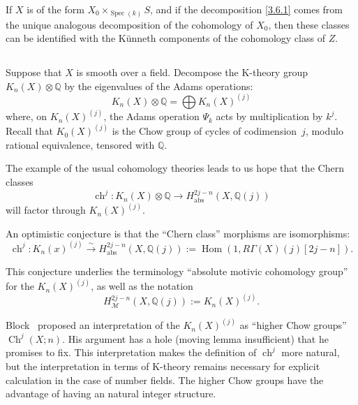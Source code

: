 \documentclass{article}
\theoremstyle{plain}
\theoremstyle{definition}
\newcommand{\sh}[1]{{\mathscr{#1}}}
\newcommand{\QQ}{\mathbb{Q}}
\newcommand{\abs}{\mathrm{abs}}
\DeclareMathOperator{\Hom}{Hom}
\DeclareMathOperator{\Spec}{Spec}
\DeclareMathOperator{\ch}{ch}
\DeclareMathOperator{\Ch}{Ch}
\newcommand{\oldpage}[1]{\marginpar{\footnotesize$\Big\vert$ \textit{p.~#1}}}
\begin{document}
If $X$ is of the form $X_0\times_{\Spec(k)}S$, and if the decomposition \cref{3.6.1} comes from the unique analogous decomposition of the cohomology of $X_0$, then these classes can be identified with the K\"{u}nneth components of the cohomology class of $Z$.


\subsection{}
\label{3.7}

Suppose that $X$ is smooth over a field.
Decompose the K-theory group $K_n(X)\otimes\QQ$ by the eigenvalues of the Adams operations:
\[
  K_n(X)\otimes\QQ = \bigoplus K_n(X)^{(j)}
\]
where, on $K_n(X)^{(j)}$, the Adams operation $\Psi_k$ acts by multiplication by $k^j$.
Recall that $K_0(X)^{(j)}$ is the Chow group of cycles of codimension~$j$, modulo rational equivalence, tensored with $\QQ$.

The example of the usual cohomology theories leads to us hope that the Chern classes
\[
  \ch^j\colon K_n(X)\otimes\QQ \to H_\abs^{2j-n}(X,\QQ(j))
\]
will factor through $K_n(X)^{(j)}$.

An optimistic conjecture is that the ``Chern class'' morphisms are isomorphisms:
\[
\label{3.7.1}
  \ch^j\colon K_n(x)^{(j)} \xrightarrow{\sim} H_\abs^{2j-n}(X,\QQ(j)) := \Hom(1,R\Gamma(X)(j)[2j-n]).
\tag{3.7.1}
\]

\oldpage{158}
This conjecture underlies the terminology ``absolute motivic cohomology group'' for the $K_n(X)^{(j)}$, as well as the notation
\[
  H_\sh{M}^{2j-n}(X,\QQ(j)) := K_n(X)^{(j)}.
\]

Block~\cite{4} proposed an interpretation of the $K_n(X)^{(j)}$ as ``higher Chow groups'' $\Ch^j(X;n)$.
His argument has a hole (moving lemma insufficient) that he promises to fix.
This interpretation makes the definition of $\ch^j$ more natural, but the interpretation in terms of K-theory remains necessary for explicit calculation in the case of number fields.
The higher Chow groups have the advantage of having an natural integer structure.


\subsection{}
\label{3.8}
\end{document}
